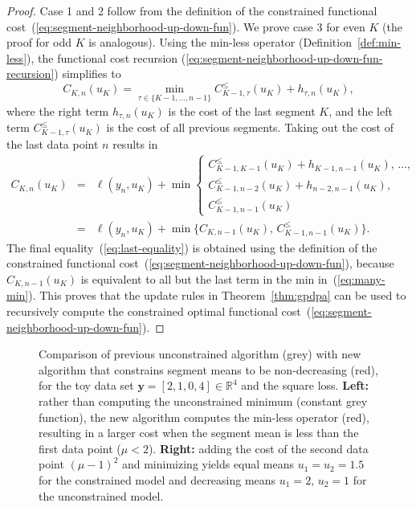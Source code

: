\documentclass[twoside,11pt]{article}
\newcommand{\RR}{\mathbb R}
\begin{document}
\begin{proof}
  Case 1 and 2 follow from the definition of the constrained
  functional cost~(\ref{eq:segment-neighborhood-up-down-fun}). We prove
  case 3 for even $K$ (the proof for odd $K$ is analogous).  Using the min-less operator (Definition~\ref{def:min-less}), the
  functional cost recursion
   (\ref{eq:segment-neighborhood-up-down-fun-recursion})  
 simplifies to
  \begin{equation}
    C_{K,n}(u_K) 
= \min_{\tau\in\{K-1,\dots,n-1\}}
C_{K-1,\tau}^\leq(u_{K}) + h_{\tau,n}(u_K),
  \end{equation}
  where the right term $h_{\tau,n}(u_K)$ is the cost of the last segment $K$,
  and the left term $C_{K-1,\tau}^\leq(u_{K})$ is the  cost of all previous segments. Taking out the cost of the last data point
    $n$ results in
  \begin{eqnarray}
    C_{K,n}(u_K)&=&\ell(y_n, u_K) + \min
    \begin{cases}
      C_{K-1,K-1}^\leq(u_{K}) + h_{K-1,n-1}(u_K),\, \dots,\\
      C_{K-1,n-2}^\leq(u_{K}) + h_{n-2,n-1}(u_K),\\
      C_{K-1,n-1}^\leq(u_{K})
\label{eq:many-min}
    \end{cases}\\ 
&=& \ell(y_n,u_K) + \min\{
C_{K,n-1}(u_K),\,
C_{K-1,n-1}^\leq(u_{K})
\}.
\label{eq:last-equality}
  \end{eqnarray}
  The final equality~(\ref{eq:last-equality}) is obtained using the
  definition of the constrained functional
  cost~(\ref{eq:segment-neighborhood-up-down-fun}), because
  $C_{K,n-1}(u_K)$ is equivalent to all but the last term in the min
  in~(\ref{eq:many-min}). This proves that the update rules in Theorem~\ref{thm:gpdpa} can be used to recursively compute the constrained optimal functional cost~(\ref{eq:segment-neighborhood-up-down-fun}).
\end{proof}

\begin{figure}[t!]
  \centering
  
  
  \vskip -0.5cm
  \caption{Comparison of previous unconstrained algorithm
    (\textcolor{Min}{grey}) with new algorithm that constrains segment
    means to be non-decreasing (\textcolor{Ckt}{red}), for the toy data
    set $\mathbf y= [ 2, 1, 0, 4 ] \in\RR^4$ and the square
    loss. \textbf{Left:} rather than computing the unconstrained
    minimum (constant grey function), the new algorithm computes the
    min-less operator (red), resulting in a larger cost when the
    segment mean is less than the first data point ($\mu <
    2$). \textbf{Right:} adding the cost of the second data point
    $(\mu-1)^2$ and minimizing yields equal means $u_1=u_2=1.5$ for
    the constrained model and decreasing means $u_1=2,\, u_2=1$ for
    the unconstrained model.}
  \label{fig:compare-unconstrained}
\end{figure}
\end{document}
